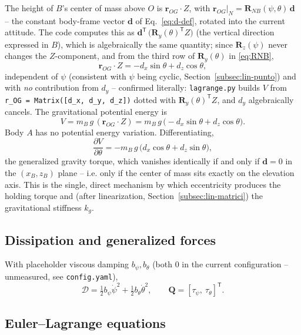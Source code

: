 \documentclass[11pt,a4paper]{article}
\numberwithin{equation}{section}
\newcommand{\bs}[1]{\boldsymbol{#1}}
\newcommand{\T}{^{\mathsf T}}
\begin{document}
The height of $B$'s center of mass above $O$ is $\bs r_{OG}\cdot Z$, with $\bs r_{OG}|_N = \bs R_{NB}(\psi,\theta)\,\bs d$ -- the constant body-frame vector $\bs d$ of Eq.~\eqref{eq:d-def}, rotated into the current attitude. The code computes this as $\bs d\T\,\big(\bs R_y(\theta)\T Z\big)$ (the vertical direction expressed in $B$), which is algebraically the same quantity; since $\bs R_z(\psi)$ never changes the $Z$-component, and from the third row of $\bs R_y(\theta)$ in \eqref{eq:RNB},
\begin{equation}
\bs r_{OG}\cdot Z = -d_x\sin\theta + d_z\cos\theta ,
\end{equation}
independent of $\psi$ (consistent with $\psi$ being cyclic, Section~\ref{subsec:lin-punto}) and with \emph{no} contribution from $d_y$ -- confirmed literally: \texttt{lagrange.py} builds $V$ from \texttt{r\_OG = Matrix([d\_x, d\_y, d\_z])} dotted with $\bs R_y(\theta)\T Z$, and $d_y$ algebraically cancels. The gravitational potential energy is
\begin{equation}
V = m_B\,g\,(\bs r_{OG}\cdot Z) = m_B\,g\,\big(-d_x\sin\theta + d_z\cos\theta\big) .
\label{eq:V}
\end{equation}
Body $A$ has no potential energy variation. Differentiating,
\begin{equation}
\frac{\partial V}{\partial\theta} = -m_B\,g\,\big(d_x\cos\theta + d_z\sin\theta\big) ,
\label{eq:dVdtheta}
\end{equation}
the generalized gravity torque, which vanishes identically if and only if $\bs d=0$ in the $(x_B,z_B)$ plane -- i.e. only if the center of mass sits exactly on the elevation axis. This is the single, direct mechanism by which eccentricity produces the holding torque and (after linearization, Section~\ref{subsec:lin-matrici}) the gravitational stiffness $k_g$.

\subsection{Dissipation and generalized forces}

With placeholder viscous damping $b_\psi,b_\theta$ (both $0$ in the current configuration -- unmeasured, see \texttt{config.yaml}),
\begin{equation}
\mathcal D = \tfrac12 b_\psi\dot\psi^2 + \tfrac12 b_\theta\dot\theta^2 ,
\qquad
\bs Q = [\tau_\psi,\ \tau_\theta]\T .
\end{equation}

\subsection{Euler--Lagrange equations}
\end{document}
